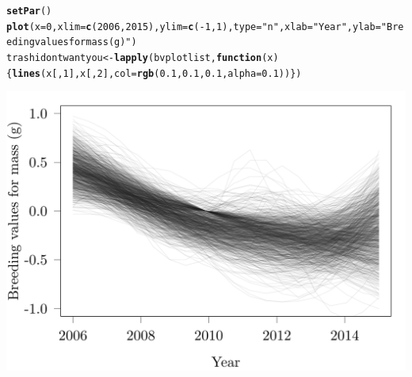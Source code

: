 \documentclass{article}\usepackage[]{graphicx}\usepackage[]{color}
\makeatletter
\def\maxwidth{ %
  \ifdim\Gin@nat@width>\linewidth
    \linewidth
  \else
    \Gin@nat@width
  \fi
}
\newcommand{\hlnum}[1]{\textcolor[rgb]{0.686,0.059,0.569}{#1}}%
\newcommand{\hlstr}[1]{\textcolor[rgb]{0.192,0.494,0.8}{#1}}%
\newcommand{\hlopt}[1]{\textcolor[rgb]{0,0,0}{#1}}%
\newcommand{\hlstd}[1]{\textcolor[rgb]{0.345,0.345,0.345}{#1}}%
\newcommand{\hlkwa}[1]{\textcolor[rgb]{0.161,0.373,0.58}{\textbf{#1}}}%
\newcommand{\hlkwb}[1]{\textcolor[rgb]{0.69,0.353,0.396}{#1}}%
\newcommand{\hlkwc}[1]{\textcolor[rgb]{0.333,0.667,0.333}{#1}}%
\newcommand{\hlkwd}[1]{\textcolor[rgb]{0.737,0.353,0.396}{\textbf{#1}}}%
\newenvironment{kframe}{%
 \def\at@end@of@kframe{}%
 \ifinner\ifhmode%
  \def\at@end@of@kframe{\end{minipage}}%
  \begin{minipage}{\columnwidth}%
 \fi\fi%
 \def\FrameCommand##1{\hskip\@totalleftmargin \hskip-\fboxsep
 \colorbox{shadecolor}{##1}\hskip-\fboxsep
     \hskip-\linewidth \hskip-\@totalleftmargin \hskip\columnwidth}%
 \MakeFramed {\advance\hsize-\width
   \@totalleftmargin\z@ \linewidth\hsize
   \@setminipage}}%
 {\par\unskip\endMakeFramed%
 \at@end@of@kframe}
\newenvironment{knitrout}{}{} %
\makeatother
\begin{document}
\begin{knitrout}
\color{fgcolor}\begin{kframe}
\begin{alltt}
\hlkwd{setPar}\hlstd{()}
\hlkwd{plot}\hlstd{(}\hlkwc{x}\hlstd{=}\hlnum{0}\hlstd{,}\hlkwc{xlim}\hlstd{=}\hlkwd{c}\hlstd{(}\hlnum{2006}\hlstd{,}\hlnum{2015}\hlstd{),}\hlkwc{ylim}\hlstd{=}\hlkwd{c}\hlstd{(}\hlopt{-}\hlnum{1}\hlstd{,}\hlnum{1}\hlstd{),}\hlkwc{type}\hlstd{=}\hlstr{"n"}\hlstd{,} \hlkwc{xlab}\hlstd{=}\hlstr{"Year"}\hlstd{,}\hlkwc{ylab}\hlstd{=}\hlstr{"Breeding values for mass (g)"}\hlstd{)}
\hlstd{trashidontwantyou}\hlkwb{<-}\hlkwd{lapply}\hlstd{(bvplotlist,} \hlkwa{function}\hlstd{(}\hlkwc{x}\hlstd{)\{}\hlkwd{lines}\hlstd{(x[,}\hlnum{1}\hlstd{],x[,}\hlnum{2}\hlstd{],} \hlkwc{col}\hlstd{=}\hlkwd{rgb}\hlstd{(}\hlnum{0.1}\hlstd{,}\hlnum{0.1}\hlstd{,}\hlnum{0.1}\hlstd{,}\hlkwc{alpha} \hlstd{=} \hlnum{0.1}\hlstd{))\})}
\end{alltt}
\end{kframe}
\includegraphics[width=\maxwidth]{figure/EvolSmooth-1} 

\end{knitrout}
\end{document}
